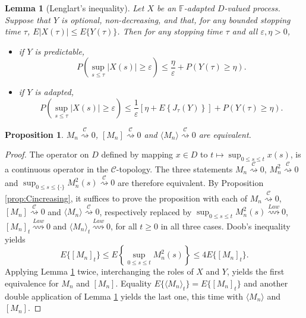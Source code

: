 \documentclass[10pt,a4paper]{amsart}
\newtheorem{prop}{Proposition}
\newtheorem{lem}{Lemma}
\def\crochet#1{\langle #1 \rangle}
\newcommand{\dF}{\ensuremath{\mathbb{F}}}
\begin{document}
\begin{lem}[Lenglart's inequality]\label{lem:lenglart}
Let $X$ be an $\dF$-adapted $D$-valued process. Suppose that $Y$ is optional, non-decreasing,
and that, for any bounded stopping time $\tau$, $E|X(\tau)|\leq E\{Y(\tau)\}$.
Then for any stopping time $\tau$ and all $\varepsilon,\eta >0$,
\begin{itemize}
\item[{a)}]
if $Y$ is predictable,
\begin{equation}\label{eng1}
P(\sup_{s\leq \tau}|X(s)|\geq\varepsilon) \leq \frac{\eta}{\varepsilon} +
P(Y(\tau)\geq\eta).
\end{equation}

\item[b)]
if $Y$ is adapted,
\begin{equation}\label{eng2}
P(\sup_{s\leq \tau}|X(s)|\geq\varepsilon) \leq \frac{1}{\varepsilon}
\left[\eta+ E\left\{J_\tau(Y) \right\}\right] +
P(Y(\tau)\geq\eta).
\end{equation}
\end{itemize}
\end{lem}

\begin{prop}\label{prop:Cto0}
$M_n \stackrel{\mathcal{C}}{\rightsquigarrow} 0$,
$[M_n] \stackrel{\mathcal{C}}{\rightsquigarrow} 0$ and
$\crochet{ M_n }  \stackrel{\mathcal{C}}{\rightsquigarrow} 0$ are equivalent.
\end{prop}

\begin{proof} The operator on $D$ defined by mapping $x\in D$ to $t\mapsto\sup_{0\le s\le t}x(s)$,
is a continuous operator in the $\mathcal{C}$-topology. The three statements
$M_n \stackrel{\mathcal{C}}{\rightsquigarrow} 0$, $M_n^2 \stackrel{\mathcal{C}}{\rightsquigarrow} 0$ and
$\sup_{0\le s\le\{\cdot\}}M_n^2(s) \stackrel{\mathcal{C}}{\rightsquigarrow} 0$ are therefore equivalent.
By Proposition \ref{prop:Cincreasing}, it suffices to prove the proposition with each of
$M_n \stackrel{\mathcal{C}}{\rightsquigarrow} 0$,
 $[M_n] \stackrel{\mathcal{C}}{\rightsquigarrow} 0$ and
$\crochet{ M_n } \stackrel{\mathcal{C}}{\rightsquigarrow} 0$,
respectively replaced by $\sup_{0\le s\le t}M_n^2(s) \stackrel{Law}{\rightsquigarrow}0$,
$[M_n]_t\stackrel{Law}{\rightsquigarrow}0$ and
$\crochet{ M_n }_t\stackrel{Law}{\rightsquigarrow}0$, for all $t\ge0$ in all three cases.
Doob's inequality yields
$$
E\{[M_n]_t\} \le E\left\{\sup_{0\le s\le t}M_n^2(s)\right\}\le 4E\{[M_n]_t\}.
$$
Applying Lemma \ref{lem:lenglart} twice, interchanging the roles of $X$ and $Y$, yields the first equivalence for $M_n$ and $[M_n]$.
Equality $E\{\crochet{ M_n }_t\} = E\{[M_n]_t\}$ and another double application of Lemma \ref{lem:lenglart} yields the last one,
this time with $\crochet{ M_n }$ and $[M_n]$.
\end{proof}
\end{document}

